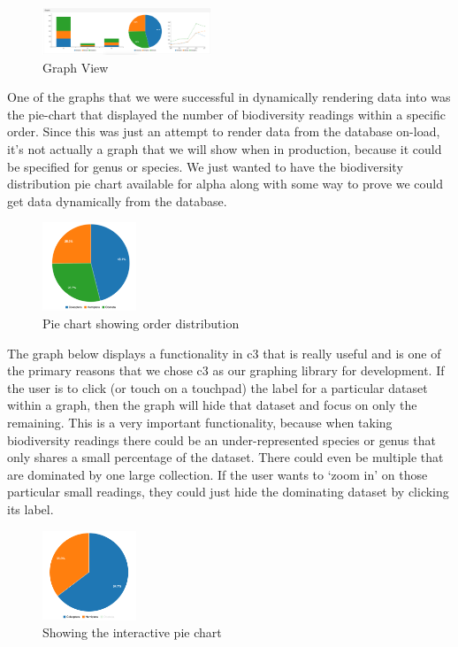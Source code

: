 \documentclass[10pt,peerreview,onecolumn,draftclsnofoot,technote]{IEEEtran}
\begin{document}
\begin{figure}[h]
\caption{Graph View}
\centering
\includegraphics[width=0.45\textwidth]{images/figure_6.jpg}
\end{figure}

One of the graphs that we were successful in dynamically rendering data into was the pie-chart that displayed the number of biodiversity readings within a specific order.
Since this was just an attempt to render data from the database on-load, it’s not actually a graph that we will show when in production, because it could be specified for genus or species.
We just wanted to have the biodiversity distribution pie chart available for alpha along with some way to prove we could get data dynamically from the database.

\begin{figure}[h]
\caption{Pie chart showing order distribution}
\centering
\includegraphics[width=0.25\textwidth]{images/figure_7.jpg}
\end{figure}

The graph below displays a functionality in c3 that is really useful and is one of the primary reasons that we chose c3 as our graphing library for development.
If the user is to click (or touch on a touchpad) the label for a particular dataset within a graph, then the graph will hide that dataset and focus on only the remaining.
This is a very important functionality, because when taking biodiversity readings there could be an under-represented species or genus that only shares a small percentage of the dataset.
There could even be multiple that are dominated by one large collection.
If the user wants to ‘zoom in’ on those particular small readings, they could just hide the dominating dataset by clicking its label.

\begin{figure}[h]
\caption{Showing the interactive pie chart}
\centering
\includegraphics[width=0.25\textwidth]{images/figure_8.jpg}
\end{figure}
\end{document}
